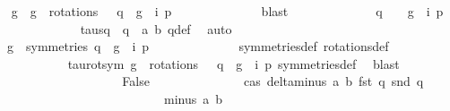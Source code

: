 \begin{isabellebody}
\ \isamarkupfalse%
\ g\ \ {\isachardoublequoteopen}g\ {\isasymin}\ rotations\ {\isasymand}\ {\isasymtau}\ q\ {\isacharequal}\ {\isacharparenleft}g\ {\isasymcirc}\ i{\isacharparenright}\ p{\isachardoublequoteclose}\isanewline
\ \ \ \ \ \ \ \ \ \ \ \ \isamarkupfalse%
\ blast\isanewline
\ \ \ \ \ \ \ \ \ \ \isamarkupfalse%
\ \isamarkupfalse%
\ {\isachardoublequoteopen}q\ {\isacharequal}\ {\isacharparenleft}{\isasymtau}\ {\isasymcirc}\ g\ {\isasymcirc}\ i{\isacharparenright}\ p{\isachardoublequoteclose}\isanewline
\ \ \ \ \ \ \ \ \ \ \ \ \isamarkupfalse%
\ tau{\isacharunderscore}sq\ {\isacartoucheopen}{\isasymtau}\ q\ {\isacharequal}\ {\isacharparenleft}a{}{\isacharcomma}\ b{}{\isacharparenright}{\isacartoucheclose}\ q{\isacharunderscore}def\ \isamarkupfalse%
\ auto\isanewline
\ \ \ \ \ \ \ \ \ \ \isamarkupfalse%
\ \isamarkupfalse%
\ {\isachardoublequoteopen}{\isacharparenleft}{\isasymexists}\ g\ {\isasymin}\ symmetries{\isachardot}\ q\ {\isacharequal}\ {\isacharparenleft}g\ {\isasymcirc}\ i{\isacharparenright}\ p{\isacharparenright}{\isachardoublequoteclose}\isanewline
\ \ \ \ \ \ \ \ \ \ \ \ \isamarkupfalse%
\ symmetries{\isacharunderscore}def\ rotations{\isacharunderscore}def\ \isanewline
\ \ \ \ \ \ \ \ \ \ \isamarkupfalse%
\ tau{\isacharunderscore}rot{\isacharunderscore}sym\ {\isacartoucheopen}g\ {\isasymin}\ rotations\ {\isasymand}\ {\isasymtau}\ q\ {\isacharequal}\ {\isacharparenleft}g\ {\isasymcirc}\ i{\isacharparenright}\ p{\isacartoucheclose}\ symmetries{\isacharunderscore}def\ \isamarkupfalse%
\ blast\ \ \ \ \ \isanewline
\ \ \ \ \ \ \ \ \isamarkupfalse%
\isanewline
\ \ \ \ \ \ \ \ \ \ \isamarkupfalse%
\ False\isanewline
\ \ \ \ \ \ \ \ \ \ \ \isamarkupfalse%
\ \isamarkupfalse%
\ cas{}{\isacharcolon}\ {\isachardoublequoteopen}delta{\isacharunderscore}minus\ a{}\ b{}\ {\isacharparenleft}fst\ q{\isacharparenright}\ {\isacharparenleft}snd\ q{\isacharparenright}\ {\isacharequal}\ {}{\isachardoublequoteclose}\isanewline
\ \ \ \ \ \ \ \ \ \ \ \ \ \ \ \ \ \ \ \ \ \ \ \ \ \ \ {\isachardoublequoteopen}{\isasymdelta}{\isacharunderscore}minus\ a{}\ b{}\ {\isacharequal}\ {}{\isachardoublequoteclose}\ \ \ \ \ \ \ \ \ \ \ \ \ \ \ \isanewline
\ \ \ \ \ \ \ \ \ \ \ \ \ \isamarkupfalse%

\end{isabellebody}
